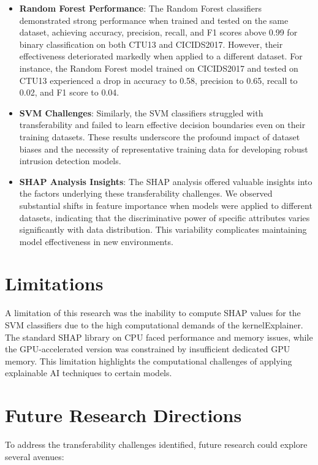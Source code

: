 \begin{itemize}
    \item \textbf{Random Forest Performance}: The Random Forest classifiers demonstrated strong performance when trained and tested on the same dataset, achieving accuracy, precision, recall, and F1 scores above 0.99 for binary classification on both CTU13 and CICIDS2017. However, their effectiveness deteriorated markedly when applied to a different dataset. For instance, the Random Forest model trained on CICIDS2017 and tested on CTU13 experienced a drop in accuracy to 0.58, precision to 0.65, recall to 0.02, and F1 score to 0.04.
    \item \textbf{SVM Challenges}: Similarly, the SVM classifiers struggled with transferability and failed to learn effective decision boundaries even on their training datasets. These results underscore the profound impact of dataset biases and the necessity of representative training data for developing robust intrusion detection models.
    \item \textbf{SHAP Analysis Insights}: The SHAP analysis offered valuable insights into the factors underlying these transferability challenges. We observed substantial shifts in feature importance when models were applied to different datasets, indicating that the discriminative power of specific attributes varies significantly with data distribution. This variability complicates maintaining model effectiveness in new environments.
\end{itemize}

\section{Limitations}

A limitation of this research was the inability to compute SHAP values for the SVM classifiers due to the high computational demands of the kernelExplainer. The standard SHAP library on CPU faced performance and memory issues, while the GPU-accelerated version was constrained by insufficient dedicated GPU memory. This limitation highlights the computational challenges of applying explainable AI techniques to certain models.

\section{Future Research Directions}

To address the transferability challenges identified, future research could explore several avenues:

